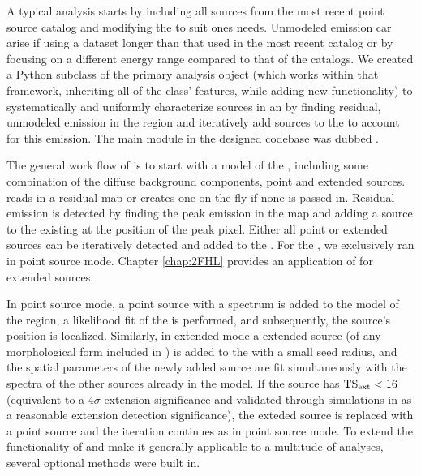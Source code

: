 A typical \lat{} analysis starts by including all sources from the most recent \lat{} point source catalog and modifying the \roi{} to suit ones needs. Unmodeled emission car arise if using a dataset longer than that used in the most recent catalog or by focusing on a different energy range compared to that of the catalogs. We created a Python subclass of the primary \ptlike{} analysis object (which works within that framework, inheriting all of the class' features, while adding new functionality) to systematically and uniformly characterize sources in an \roi{} by finding residual, unmodeled emission in the region and iteratively add sources to the \roi{} to account for this emission. The main module in the designed codebase was dubbed \srcs{}. 

The general work flow of \srcs{} is to start with a model of the \roi{}, including some combination of the diffuse background components, point  and extended sources. \srcs{} reads in a residual \ts{} map or creates one on the fly if none is passed in. Residual emission is detected by finding the peak emission in the \ts{} map and adding a source to the existing \roi{} at the position of the peak pixel. Either all point or extended sources can be iteratively detected and added to the \roi{}. For the \snrcat{}, we exclusively ran \srcs{} in point source mode. Chapter \ref{chap:2FHL} provides an application of \srcs{} for extended sources. 

In point source mode, a point source with a \pl{} spectrum is added to the model of the region, a likelihood fit of the \roi{} is performed, and subsequently, the source's position is localized. Similarly, in extended mode a \pl{} extended source (of any morphological form included in \ptlike{}) is added to the \roi{} with a small seed radius, and the spatial parameters of the newly added source are fit simultaneously with the spectra of the other sources already in the model. If the source has ${\rm TS_{ext} < 16}$ (equivalent to a  4$\sigma$ extension significance and validated through simulations in \cite{Lande12} as a reasonable extension detection significance), the exteded source is replaced with a point source and the iteration continues as in point source mode. To extend the functionality of \srcs{} and make it generally applicable to a multitude of \lat{} analyses, several optional methods were built in. 

